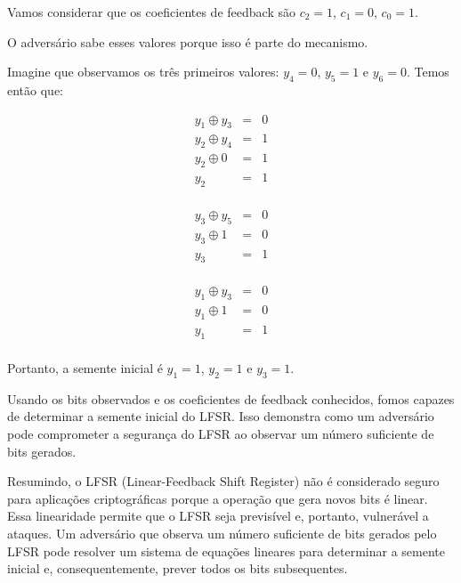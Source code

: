 \begin{example}
  Vamos considerar que os coeficientes de feedback são $c_2 = 1$, $c_1 = 0$, $c_0 = 1$.

  O adversário sabe esses valores porque isso é parte do mecanismo.

  Imagine que observamos os três primeiros valores: $y_4 = 0$, $y_5 = 1$ e $y_6 = 0$.
  Temos então que:

  \begin{displaymath}
    \begin{array}{rcl}
      y_1 \oplus y_3 & = & 0 \\
      y_2 \oplus y_4 & = & 1 \\
      y_2 \oplus 0 & = & 1\\
      y_2 & = & 1 \\
    \end{array}
  \end{displaymath}

  \begin{displaymath}
    \begin{array}{rcl}
      y_3 \oplus y_5 & = & 0 \\
      y_3 \oplus 1 & = & 0 \\
      y_3 & = & 1 \\
    \end{array}
  \end{displaymath}

  \begin{displaymath}
    \begin{array}{rcl}
      y_1 \oplus y_3 & = & 0 \\
      y_1 \oplus 1 & = &  0\\
      y_1 & = & 1 \\
    \end{array}
  \end{displaymath}

  Portanto, a semente inicial é $y_1 = 1$, $y_2 = 1$ e $y_3 = 1$.

  Usando os bits observados e os coeficientes de feedback conhecidos, fomos capazes de determinar a semente inicial do LFSR.
  Isso demonstra como um adversário pode comprometer a segurança do LFSR ao observar um número suficiente de bits gerados.
\end{example}

Resumindo, o LFSR (Linear-Feedback Shift Register) não é considerado seguro para aplicações criptográficas porque a operação que gera novos bits é linear.
Essa linearidade permite que o LFSR seja previsível e, portanto, vulnerável a ataques.
Um adversário que observa um número suficiente de bits gerados pelo LFSR pode resolver um sistema de equações lineares para determinar a semente inicial e, consequentemente, prever todos os bits subsequentes.

